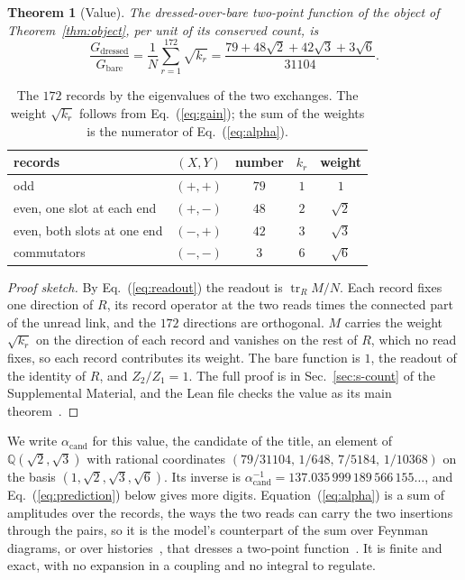 \documentclass[aps,prl,reprint,superscriptaddress,longbibliography,nofootinbib,floatfix]{revtex4-2}
\newtheorem{theorem}{Theorem}
\theoremstyle{definition}
\newcommand{\tr}{\operatorname{tr}}
\begin{document}


\begin{theorem}[Value]
\label{thm:value}
The dressed-over-bare two-point function of the object of Theorem~\ref{thm:object}, per unit of its conserved count, is
\begin{equation}
\frac{G_{\mathrm{dressed}}}{G_{\mathrm{bare}}} = \frac{1}{N}\sum_{r=1}^{172}\sqrt{k_{r}} = \frac{79+48\sqrt{2}+42\sqrt{3}+3\sqrt{6}}{31104}.
\label{eq:alpha}
\end{equation}
\end{theorem}

\begin{table}[b]
\caption{The $172$ records by the eigenvalues of the two exchanges. The weight $\sqrt{k_{r}}$ follows from Eq.~(\ref{eq:gain}); the sum of the weights is the numerator of Eq.~(\ref{eq:alpha}).}
\label{tab:sectors}
\begin{ruledtabular}
\begin{tabular}{lcccc}
records & $(X,Y)$ & number & $k_{r}$ & weight \\ \hline
odd & $(+,+)$ & $79$ & $1$ & $1$ \\
even, one slot at each end & $(+,-)$ & $48$ & $2$ & $\sqrt{2}$ \\
even, both slots at one end & $(-,+)$ & $42$ & $3$ & $\sqrt{3}$ \\
commutators & $(-,-)$ & $3$ & $6$ & $\sqrt{6}$ \\
\end{tabular}
\end{ruledtabular}
\end{table}

\begin{proof}[Proof sketch]
By Eq.~(\ref{eq:readout}) the readout is $\tr_{R}M/N$. Each record fixes one direction of $R$, its record operator at the two reads times the connected part of the unread link, and the $172$ directions are orthogonal. $M$ carries the weight $\sqrt{k_{r}}$ on the direction of each record and vanishes on the rest of $R$, which no read fixes, so each record contributes its weight. The bare function is $1$, the readout of the identity of $R$, and $Z_{2}/Z_{1}=1$. The full proof is in Sec.~\ref{sec:s-count} of the Supplemental Material, and the Lean file checks the value as its main theorem~\cite{SM}.
\end{proof}

We write $\alpha_{\mathrm{cand}}$ for this value, the candidate of the title, an element of $\mathbb{Q}(\sqrt{2},\sqrt{3})$ with rational coordinates $(79/31104,\,1/648,\,7/5184,\,1/10368)$ on the basis $(1,\sqrt{2},\sqrt{3},\sqrt{6})$. Its inverse is $\alpha_{\mathrm{cand}}^{-1}=137.035\,999\,189\,566\,155\ldots$, and Eq.~(\ref{eq:prediction}) below gives more digits. Equation~(\ref{eq:alpha}) is a sum of amplitudes over the records, the ways the two reads can carry the two insertions through the pairs, so it is the model's counterpart of the sum over Feynman diagrams, or over histories~\cite{feynman1948}, that dresses a two-point function~\cite{peskin1995}. It is finite and exact, with no expansion in a coupling and no integral to regulate.
\end{document}
